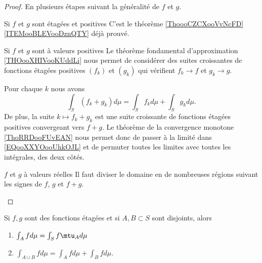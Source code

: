 \begin{proof}
    En plusieurs étapes suivant la généralité de \( f\) et \( g\).
    \begin{subproof}
        \item[Si \( f\) et \( g\) sont étagées et positives]
            C'est le théorème \ref{ThoooCZCXooVvNcFD}\ref{ITEMooBLEVooDznQTY} déjà prouvé.
        \item[Si \(f\) et \( g\) sont à valeurs positives]
            Le théorème fondamental d'approximation \ref{THOooXHIVooKUddLi} nous permet de considérer des suites croissantes de fonctions étagées positives \( (f_k)\) et \( (g_k)\) qui vérifient \( f_k\to f\) et \( g_k\to g\).

            Pour chaque \( k\) nous avons 
            \begin{equation}        \label{EQooXXYOooUhkOJL}
                \int_S(f_k+g_k)d\mu=\int_Sf_kd\mu+\int_Sg_kd\mu.
            \end{equation}
            De plus, la suite \( k\mapsto f_k+g_k\) est une suite croissante de fonctions étagées positives convergeant vers \( f+g\). Le théorème de la convergence monotone \ref{ThoRRDooFUvEAN} nous permet donc de passer à la limité dans \eqref{EQooXXYOooUhkOJL} et de permuter toutes les limites avec toutes les intégrales, des deux côtés.
        \item[\( f\) et \( g\) à valeurs réelles]
            Il faut diviser le domaine en de nombreuses régions suivant les signes de \( f\), \( g\) et \( f+g\).
    \end{subproof}
\end{proof}

\begin{proposition}
    Si \( f,g\) sont des fonctions étagées et si \( A,B\subset S\) sont disjoints, alors
    \begin{enumerate}
        \item
            \( \int_Afd\mu=\int_Sf\mtu_Ad\mu\)
        \item
            \( \int_{A\cup B}fd\mu=\int_Afd\mu+\int_Bfd\mu\).
    \end{enumerate}
\end{proposition}

